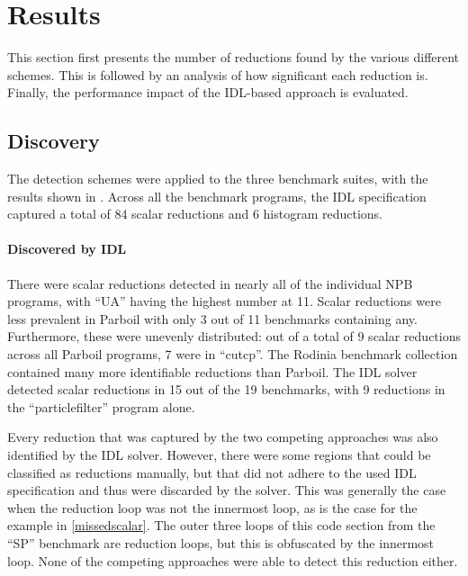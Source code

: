 \section{Results}


    This section first presents the number of reductions found by the various
    different schemes.
    This is followed by an analysis of how significant each reduction is.
    Finally, the performance impact of the IDL-based approach is evaluated.
       
\subsection{Discovery}

    The detection schemes were applied to the three benchmark suites, with the
    results shown in . 
    Across all the benchmark programs, the IDL specification captured a total of
    84 scalar reductions and 6 histogram reductions.

    \paragraph*{Discovered by IDL}
    There were scalar reductions detected in nearly all of the individual NPB
    programs, with ``UA'' having the highest number at 11.
    Scalar reductions were less prevalent in Parboil with only 3 out of 11
    benchmarks containing any.
    Furthermore, these were unevenly distributed: out of a total of 9 scalar
    reductions across all Parboil programs, 7 were in ``cutcp''.
    The Rodinia benchmark collection contained many more identifiable reductions
    than Parboil.
    The IDL solver detected scalar reductions in 15 out of the 19 benchmarks,
    with 9 reductions in the ``particlefilter'' program alone.

    Every reduction that was captured by the two competing approaches was also
    identified by the IDL solver.
    However, there were some regions that could be classified as reductions
    manually, but that did not adhere to the used IDL specification and thus
    were discarded by the solver.
    This was generally the case when the reduction loop was not the innermost
    loop, as is the case for the example in \autoref{missedscalar}.
    The outer three loops of this code section from the ``SP'' benchmark are
    reduction loops, but this is obfuscated by the innermost loop.
    None of the competing approaches were able to detect this reduction either.

